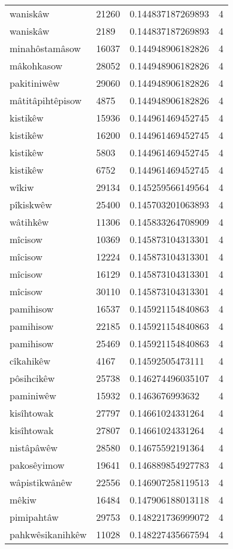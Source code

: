 \begin{longtable}{llll}
waniskâw & 21260 & 0.144837187269893 & 4 \\
waniskâw & 2189 & 0.144837187269893 & 4 \\
minahôstamâsow & 16037 & 0.144948906182826 & 4 \\
mâkohkasow & 28052 & 0.144948906182826 & 4 \\
pakitiniwêw & 29060 & 0.144948906182826 & 4 \\
mâtitâpihtêpisow & 4875 & 0.144948906182826 & 4 \\
kistikêw & 15936 & 0.144961469452745 & 4 \\
kistikêw & 16200 & 0.144961469452745 & 4 \\
kistikêw & 5803 & 0.144961469452745 & 4 \\
kistikêw & 6752 & 0.144961469452745 & 4 \\
wîkiw & 29134 & 0.145259566149564 & 4 \\
pîkiskwêw & 25400 & 0.145703201063893 & 4 \\
wâtihkêw & 11306 & 0.145833264708909 & 4 \\
mîcisow & 10369 & 0.145873104313301 & 4 \\
mîcisow & 12224 & 0.145873104313301 & 4 \\
mîcisow & 16129 & 0.145873104313301 & 4 \\
mîcisow & 30110 & 0.145873104313301 & 4 \\
pamihisow & 16537 & 0.145921154840863 & 4 \\
pamihisow & 22185 & 0.145921154840863 & 4 \\
pamihisow & 25469 & 0.145921154840863 & 4 \\
cîkahikêw & 4167 & 0.14592505473111 & 4 \\
pôsihcikêw & 25738 & 0.146274496035107 & 4 \\
paminiwêw & 15932 & 0.1463676993632 & 4 \\
kisîhtowak & 27797 & 0.14661024331264 & 4 \\
kisîhtowak & 27807 & 0.14661024331264 & 4 \\
nistâpâwêw & 28580 & 0.14675592191364 & 4 \\
pakosêyimow & 19641 & 0.146889854927783 & 4 \\
wâpistikwânêw & 22556 & 0.146907258119513 & 4 \\
mêkiw & 16484 & 0.147906188013118 & 4 \\
pimipahtâw & 29753 & 0.148221736999072 & 4 \\
pahkwêsikanihkêw & 11028 & 0.148227435667594 & 4 \\

\end{longtable}
